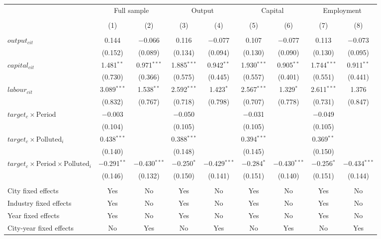 \documentclass[12pt]{article}
\begin{document}
\begin{table}[!htb]
\begin{adjustbox}{width=\textwidth, totalheight=\baselineskip,keepaspectratio}
\begin{tabular}{@{\extracolsep{5pt}}lcccccccc}
\\[-1.8ex]
            &\multicolumn{2}{c}{Full sample}&\multicolumn{2}{c}{Output}&\multicolumn{2}{c}{Capital}&\multicolumn{2}{c}{Employment}\\
\\[-1.8ex] & (1) & (2) & (3) & (4) & (5) & (6) & (7) & (8)\\ 
\hline \\[-1.8ex] 
  $output_{cit}$ & 0.144 & $-$0.066 & 0.116 & $-$0.077 & 0.107 & $-$0.077 & 0.113 & $-$0.073 \\ 
  & (0.152) & (0.089) & (0.134) & (0.094) & (0.130) & (0.090) & (0.130) & (0.095) \\ 
  $capital_{cit}$ & 1.481$^{**}$ & 0.971$^{***}$ & 1.885$^{***}$ & 0.942$^{**}$ & 1.930$^{***}$ & 0.905$^{**}$ & 1.744$^{***}$ & 0.911$^{**}$ \\ 
  & (0.730) & (0.366) & (0.575) & (0.445) & (0.557) & (0.401) & (0.551) & (0.441) \\ 
  $labour_{cit}$ & 3.089$^{***}$ & 1.538$^{**}$ & 2.592$^{***}$ & 1.423$^{*}$ & 2.567$^{***}$ & 1.329$^{*}$ & 2.611$^{***}$ & 1.376 \\ 
  & (0.832) & (0.767) & (0.718) & (0.798) & (0.707) & (0.778) & (0.731) & (0.847) \\ 
   $target_c \times \text{Period}$  & $-$0.003 &  & $-$0.050 &  & $-$0.031 &  & $-$0.049 &  \\ 
  & (0.104) &   & (0.105) &   & (0.105) &   & (0.105) &   \\ 
   $target_c \times \text{Polluted}_i$  & 0.438$^{***}$ &  & 0.388$^{***}$ &  & 0.394$^{***}$ &  & 0.369$^{**}$ &  \\ 
  & (0.140) &   & (0.148) &   & (0.145) &   & (0.150) &   \\ 
   $target_c \times \text{Period} \times \text{Polluted}_i$  & $-$0.291$^{**}$ & $-$0.430$^{***}$ & $-$0.250$^{*}$ & $-$0.429$^{***}$ & $-$0.284$^{*}$ & $-$0.430$^{***}$ & $-$0.256$^{*}$ & $-$0.434$^{***}$ \\ 
  & (0.146) & (0.132) & (0.150) & (0.141) & (0.151) & (0.140) & (0.151) & (0.144) \\ 
 \hline \\[-1.8ex] 
City fixed effects & Yes & No & Yes & No & Yes & No & Yes & No \\ 
Industry fixed effects & Yes & No & Yes & No & Yes & No & Yes & No \\ 
Year fixed effects & Yes & No & Yes & No & Yes & No & Yes & No \\ 
City-year fixed effects & No & Yes & No & Yes & No & Yes & No & Yes \\ 

\end{tabular}
\end{adjustbox}
\end{table}
\end{document}
